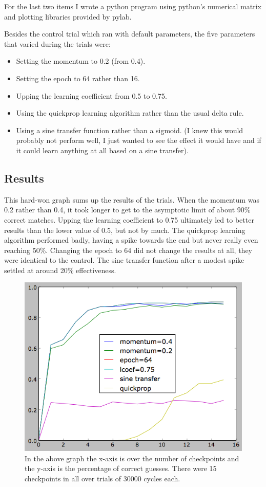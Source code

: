 \documentclass[12pt]{article}
\begin{document}
For the last two items I wrote a python program using python's numerical matrix and plotting libraries provided by pylab.  

Besides the control trial which ran with default parameters, the five parameters that varied during the trials were:

\begin{itemize}
\item Setting the momentum to 0.2 (from 0.4).
\item Setting the epoch to 64 rather than 16.
\item Upping the learning coefficient from 0.5 to 0.75.
\item Using the quickprop learning algorithm rather than the usual delta rule.
\item Using a sine transfer function rather than a sigmoid.  (I knew this would probably not perform well, I just wanted to see the effect it would have and if it could learn anything at all based on a sine transfer).
\end{itemize}

\subsection{Results}

This hard-won graph sums up the results of the trials.  When the momentum was 0.2 rather than 0.4, it took longer to get to the asymptotic limit of about 90\% correct matches.  Upping the learning coefficient to 0.75 ultimately led to better results than the lower value of 0.5, but not by much.  The quickprop learning algorithm performed badly, having a spike towards the end but never really even reaching 50\%.  Changing the epoch to 64 did not change the results at all, they were identical to the control.  The sine transfer function after a modest spike settled at around 20\% effectiveness.  

\begin{figure}[h!]
  \centering
    \includegraphics[scale=0.6]{results.png}
  \caption{In the above graph the x-axis is over the number of checkpoints and the y-axis is the percentage of correct guesses.  There were 15 checkpoints in all over trials of 30000 cycles each.}
\end{figure}
\end{document}
